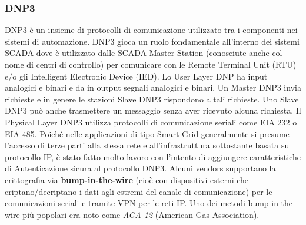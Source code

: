 \subsubsection{DNP3}
DNP3 è un insieme di protocolli di comunicazione utilizzato tra i componenti nei sistemi di automazione. DNP3 gioca un ruolo fondamentale all'interno dei sistemi SCADA dove è utilizzato dalle SCADA Master Station (conosciute anche col nome di centri di controllo) per comunicare con le Remote Terminal Unit (RTU) e/o gli Intelligent Electronic Device (IED). Lo User Layer DNP ha input analogici e binari e da in output segnali analogici e binari. Un Master DNP3 invia richieste e in genere le stazioni Slave DNP3 rispondono a tali richieste. Uno Slave DNP3 può anche trasmettere un messaggio senza aver ricevuto alcuna richiesta. Il Physical Layer DNP3 utilizza protocolli di comunicazione seriali come EIA 232 o EIA 485. Poiché nelle applicazioni di tipo Smart Grid generalmente si presume l'accesso di terze parti alla stessa rete e all'infrastruttura sottostante basata su protocollo IP, è stato fatto molto lavoro con l'intento di aggiungere caratteristiche di Autenticazione sicura al protocollo DNP3. Alcuni vendors supportano la crittografia via \textbf{bump-in-the-wire} (cioè con dispositivi esterni che criptano/decriptano i dati agli estremi del canale di comunicazione) per le comunicazioni seriali e tramite VPN per le reti IP. Uno dei metodi bump-in-the-wire più popolari era noto come \emph{AGA-12} (American Gas Association).
